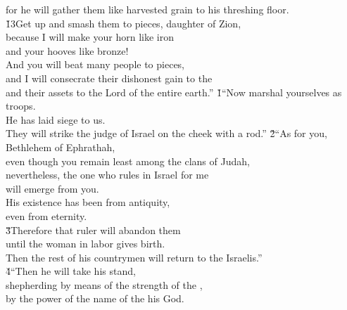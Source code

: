 \begin{poetry}
\poemlll       for he will gather them like harvested grain to his threshing floor. \\
\poeml \v{13}Get up and smash them to pieces, daughter of Zion, \\
\poemll    because I will make your horn like iron \\
\poemlll       and your hooves like bronze! \\
\poeml And you will beat many people to pieces, \\
\poemll    and I will consecrate their dishonest gain to the  \\
\poemlll       and their assets to the Lord of the entire earth.''
\poeml {}
\v{1}``Now marshal yourselves as troops. \\
\poeml He has laid siege to us. \\
\poemll    They will strike the judge of Israel on the cheek with a rod.''
\poeml \v{2}``As for you, Bethlehem of Ephrathah, \\
\poemll    even though you remain least among the clans of Judah, \\
\poeml nevertheless, the one who rules in Israel for me \\
\poemll    will emerge from you. \\
\poeml His existence has been from antiquity, \\
\poemll    even from eternity. \\
\poeml \v{3}Therefore that ruler will abandon them \\
\poemll    until the woman in labor gives birth. \\
\poeml Then the rest of his countrymen will return to the Israelis.'' \\
\poeml \v{4}``Then he will take his stand, \\
\poemll    shepherding by means of the strength of the , \\
\poemlll       by the power of the name of the  his God. \\

\end{poetry}

